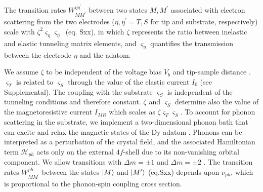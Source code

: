 \documentclass[
reprint,amsmath,amssymb,aps]{revtex4-2}
\begin{document}
The transition rates $W_{MM^{\prime}}^{\eta \eta^{\prime}}$ between two states $M,M^{\prime}$ associated with electron scattering from the two electrodes ($\eta,\eta^{\prime}=T,S$ for tip and substrate, respectively) scale with $\zeta^2 \varsigma_{\eta} \varsigma_{\eta^{\prime}}$ (eq. Sxx), in which $\zeta$ represents the ratio between inelastic and elastic tunneling matrix elements, and
$\varsigma_{\eta}$ quantifies the transmission between the electrode $\eta$ and the adatom.




We assume $\zeta$ to be independent of the voltage bias $V_b$ and tip-sample distance \cite{fern2009,paul_ControlMillisecondSpin_2017,lorenteEfficientSpinTransitions2009,nussinovNoiseSpectroscopySingle2003}.
$\varsigma_T$ is related to $\varsigma_S$ through the value of the elastic current $I_0$ (see Supplemental). The coupling with the substrate $\varsigma_S$ is independent of the tunneling conditions and therefore constant. $\zeta$ and $\varsigma_S$ determine also the value of the magnetoresistive current $I_{MR}$ which scales as $\zeta \varsigma_{T} \varsigma_{S}$.
To account for phonon scattering in the substrate, we implement a two-dimensional phonon bath that can excite and relax the magnetic states of the Dy adatom \cite{cervetti2016,politi_tunneling_1995,Leuenberger2000}. Phonons can be interpreted as a perturbation of the crystal field, and the associated Hamiltonian term $\mathcal{H}_{ph}$ acts only on the external $4f$-shell due to its non-vanishing orbital component. We allow transitions with $\Delta m = \pm 1$ and $\Delta m = \pm 2$ \citep{cervetti2016}. 
The transition rates $W_{MM^{\prime}}^{ph}$ between the states $\ket{M}$ and $\ket{M^{\prime}}$ (eq.Sxx) depends upon $\nu_{ph}$, which is proportional to the phonon-spin coupling cross section.
\end{document}
